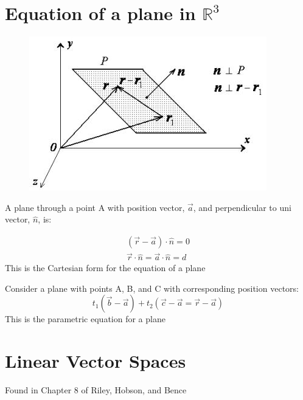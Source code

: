 \documentclass[a4paper, 11pt, normalem]{report}
\newcommand\R{\mathbb{R}}
\begin{document}
\section{Equation of a plane in $\R^3$}
\begin{figure}
    \vspace{-20pt}
    \begin{center}
        \includegraphics[scale=0.6]{Plane.jpg}
    \end{center}
    \vspace{-80pt}
\end{figure}
A plane through a point A with position vector, $\vec{a}$, and perpendicular to uni vector, $\hat{n}$, is:

\begin{gather*}
    (\vec{r} - \vec{a}) \cdot \hat{n} = 0 \\
    \vec{r} \cdot \hat{n} = \vec{a} \cdot \hat{n} = d
\end{gather*}
This is the Cartesian form for the equation of a plane

Consider a plane with points A, B, and C with corresponding position vectors:
\begin{equation*}
    t_{1}(\vec{b} - \vec{a}) + t_{2}(\vec{c} - \vec{a} = \vec{r} - \vec{a})
\end{equation*}
This is the parametric equation for a plane

\section{Linear Vector Spaces}
Found in Chapter 8 of Riley, Hobson, and Bence
\end{document}
